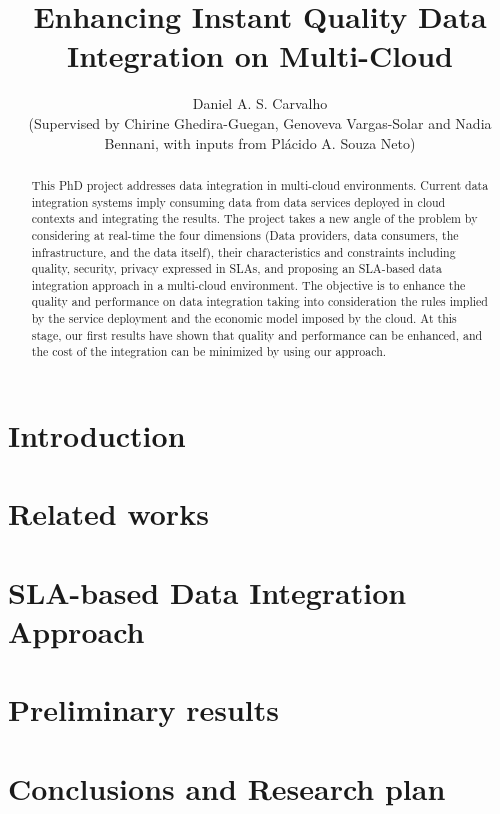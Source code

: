 \documentclass{llncs}
\theoremstyle{plain}
\theoremstyle{plain}
\theoremstyle{plain}
\theoremstyle{plain}
\begin{document}
    

\title{Enhancing Instant Quality Data Integration on Multi-Cloud}
\author{Daniel A. S. Carvalho \\ (Supervised by Chirine Ghedira-Guegan, Genoveva Vargas-Solar and
	   Nadia Bennani, with inputs from Pl\'acido A. Souza Neto)}
 

\maketitle

  
\begin{abstract}
This PhD project addresses data integration in multi-cloud environments. Current data integration systems imply consuming data from data services deployed in cloud contexts and integrating the results.
The project takes a new angle of the problem by considering at real-time the four dimensions (Data providers, data consumers, the infrastructure, and the data itself), their characteristics and constraints including quality, security, privacy expressed in SLAs, and proposing an SLA-based data integration approach in a multi-cloud environment.
The objective is to enhance the quality and performance on data integration
taking into consideration the rules implied by the service deployment and the economic model imposed by the cloud. 
At this stage, our first results have shown that quality and performance can be
enhanced, and the cost of the integration can be minimized by using our
approach.   
\end{abstract}
 
 

\section{Introduction}


\section{Related works}


\section{SLA-based Data Integration Approach}


\section{Preliminary results}


\section{Conclusions and Research plan}


 
 

\end{document}
